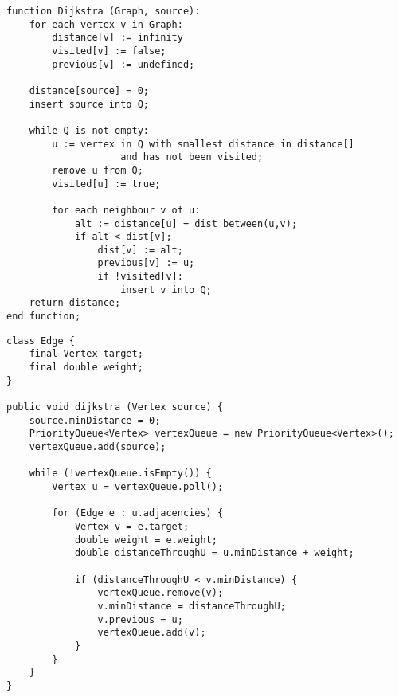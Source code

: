 \documentclass[11pt,a4paper]{article}
\theoremstyle{def}
\begin{document}
\begin{Verbatim}[frame=single]
function Dijkstra (Graph, source):
    for each vertex v in Graph:
        distance[v] := infinity
        visited[v] := false;
        previous[v] := undefined;
    
    distance[source] = 0;
    insert source into Q;

    while Q is not empty:
        u := vertex in Q with smallest distance in distance[] 
                    and has not been visited;
        remove u from Q;
        visited[u] := true;

        for each neighbour v of u:
            alt := distance[u] + dist_between(u,v);
            if alt < dist[v];
                dist[v] := alt;
                previous[v] := u;
                if !visited[v]:
                    insert v into Q;
    return distance;
end function;
\end{Verbatim}
\newpage
\begin{lstlisting}[frame=none]
class Edge {
	final Vertex target;
	final double weight;
}

public void dijkstra (Vertex source) {
	source.minDistance = 0;
	PriorityQueue<Vertex> vertexQueue = new PriorityQueue<Vertex>();
	vertexQueue.add(source);

	while (!vertexQueue.isEmpty()) {
		Vertex u = vertexQueue.poll();
	
		for (Edge e : u.adjacencies) {
			Vertex v = e.target;
			double weight = e.weight;
			double distanceThroughU = u.minDistance + weight;
	
			if (distanceThroughU < v.minDistance) {
				vertexQueue.remove(v);
				v.minDistance = distanceThroughU;
				v.previous = u;
				vertexQueue.add(v);
			}
		}
	}
}
\end{lstlisting}
\end{document}
